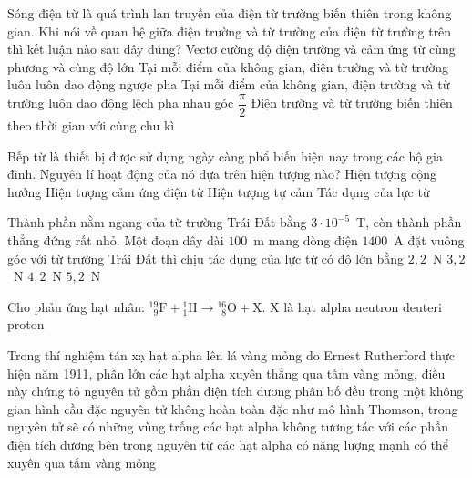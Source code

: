 	\begin{ex}%
		Sóng điện từ là quá trình lan truyền của điện từ trường biến thiên trong không gian. Khi nói về quan hệ giữa điện trường và từ trường của điện từ trường trên thì kết luận nào sau đây đúng?
		\choice
		{Vectơ cường độ điện trường và cảm ứng từ cùng phương và cùng độ lớn}
		{Tại mỗi điểm của không gian, điện trường và từ trường luôn luôn dao động ngược pha}
		{Tại mỗi điểm của không gian, điện trường và từ trường luôn dao động lệch pha nhau góc $\dfrac{\pi}{2}$}
		{\True Điện trường và từ trường biến thiên theo thời gian với cùng chu kì}
	\end{ex}

	\begin{ex}%
		Bếp từ là thiết bị được sử dụng ngày càng phổ biến hiện nay trong các hộ gia đình. Nguyên lí hoạt động của nó dựa trên hiện tượng nào?
		\choice
		{Hiện tượng cộng hưởng}
		{\True Hiện tượng cảm ứng điện từ}
		{Hiện tượng tự cảm}
		{Tác dụng của lực từ}
	\end{ex}

	\begin{ex}%
		Thành phần nằm ngang của từ trường Trái Đất bằng $3\cdot 10^{-5}$~T, còn thành phần thẳng đứng rất nhỏ. Một đoạn dây dài $100$~m mang dòng điện $1400$~A đặt vuông góc với từ trường Trái Đất thì chịu tác dụng của lực từ có độ lớn bằng
		\choice
		{$2{,}2$~N}
		{$3{,}2$~N}
		{\True $4{,}2$~N}
		{$5{,}2$~N}
	\end{ex}

	\begin{ex}%
		Cho phản ứng hạt nhân: ${}^{19}_{\phantom{1}9}\text{F}+{}^1_1\text{H}\to{}^{16}_{\phantom{1}8}\text{O}+\text{X}$. X là hạt
		\choice
		{\True alpha}
		{neutron}
		{deuteri}
		{proton}
	\end{ex}

	\begin{ex}%
		Trong thí nghiệm tán xạ hạt alpha lên lá vàng mỏng do Ernest Rutherford thực hiện năm 1911, phần lớn các hạt alpha xuyên thẳng qua tấm vàng mỏng, điều này chứng tỏ
		\choice
		{nguyên tử gồm phần điện tích dương phân bố đều trong một không gian hình cầu đặc}
		{\True nguyên tử không hoàn toàn đặc như mô hình Thomson, trong nguyên tử sẽ có những vùng trống}
		{các hạt alpha không tương tác với các phần điện tích dương bên trong nguyên tử}
		{các hạt alpha có năng lượng mạnh có thể xuyên qua tấm vàng mỏng}
	\end{ex}

